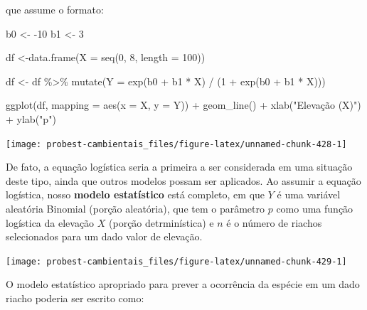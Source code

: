 \documentclass[
]{book}
\newenvironment{Shaded}{\begin{snugshade}}{\end{snugshade}}
\newcommand{\AttributeTok}[1]{\textcolor[rgb]{0.77,0.63,0.00}{#1}}
\newcommand{\DecValTok}[1]{\textcolor[rgb]{0.00,0.00,0.81}{#1}}
\newcommand{\FunctionTok}[1]{\textcolor[rgb]{0.00,0.00,0.00}{#1}}
\newcommand{\NormalTok}[1]{#1}
\newcommand{\OtherTok}[1]{\textcolor[rgb]{0.56,0.35,0.01}{#1}}
\newcommand{\SpecialCharTok}[1]{\textcolor[rgb]{0.00,0.00,0.00}{#1}}
\newcommand{\StringTok}[1]{\textcolor[rgb]{0.31,0.60,0.02}{#1}}
\begin{document}
que assume o formato:

\begin{Shaded}
\begin{Highlighting}[]
\NormalTok{b0 }\OtherTok{\textless{}{-}} \SpecialCharTok{{-}}\DecValTok{10}
\NormalTok{b1 }\OtherTok{\textless{}{-}} \DecValTok{3}

\NormalTok{df }\OtherTok{\textless{}{-}}\FunctionTok{data.frame}\NormalTok{(}\AttributeTok{X =} \FunctionTok{seq}\NormalTok{(}\DecValTok{0}\NormalTok{, }\DecValTok{8}\NormalTok{, }\AttributeTok{length =} \DecValTok{100}\NormalTok{))}

\NormalTok{df }\OtherTok{\textless{}{-}}\NormalTok{ df }\SpecialCharTok{\%\textgreater{}\%} \FunctionTok{mutate}\NormalTok{(}\AttributeTok{Y =} \FunctionTok{exp}\NormalTok{(b0 }\SpecialCharTok{+}\NormalTok{ b1 }\SpecialCharTok{*}\NormalTok{ X) }\SpecialCharTok{/}\NormalTok{ (}\DecValTok{1} \SpecialCharTok{+} \FunctionTok{exp}\NormalTok{(b0 }\SpecialCharTok{+}\NormalTok{ b1 }\SpecialCharTok{*}\NormalTok{ X)))}

\FunctionTok{ggplot}\NormalTok{(df, }\AttributeTok{mapping =} \FunctionTok{aes}\NormalTok{(}\AttributeTok{x =}\NormalTok{ X, }\AttributeTok{y =}\NormalTok{ Y)) }\SpecialCharTok{+}
  \FunctionTok{geom\_line}\NormalTok{() }\SpecialCharTok{+}
  \FunctionTok{xlab}\NormalTok{(}\StringTok{"Elevação (X)"}\NormalTok{) }\SpecialCharTok{+}
  \FunctionTok{ylab}\NormalTok{(}\StringTok{"p"}\NormalTok{)}
\end{Highlighting}
\end{Shaded}

\begin{center}\texttt{[image: probest-cambientais\_files/figure-latex/unnamed-chunk-428-1]} \end{center}

De fato, a equação logística seria a primeira a ser considerada em uma situação deste tipo, ainda que outros modelos possam ser aplicados. Ao assumir a equação logística, nosso \textbf{modelo estatístico} está completo, em que \(Y\) é uma variável aleatória Binomial (porção aleatória), que tem o parâmetro \(p\) como uma função logística da elevação \(X\) (porção detrminística) e \(n\) é o número de riachos selecionados para um dado valor de elevação.

\begin{center}\texttt{[image: probest-cambientais\_files/figure-latex/unnamed-chunk-429-1]} \end{center}

O modelo estatístico apropriado para prever a ocorrência da espécie em um dado riacho poderia ser escrito como:
\end{document}
